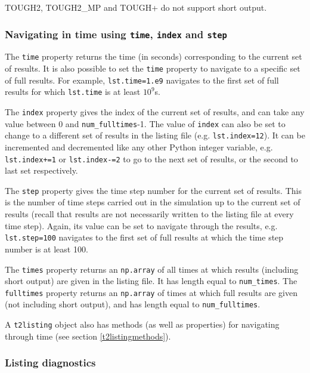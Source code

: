 TOUGH2, TOUGH2\_MP and TOUGH+ do not support short output.

\subsubsection{Navigating in time using \texttt{time}, \texttt{index} and \texttt{step}}

The \texttt{time} property returns the time (in seconds) corresponding to the current set of results.  It is also possible to set the \texttt{time} property to navigate to a specific set of full results.  For example, \texttt{lst.time=1.e9} navigates to the first set of full results for which \texttt{lst.time} is at least $10^9$s.

The \texttt{index} property gives the index of the current set of results, and can take any value between 0 and \texttt{num\_fulltimes}-1.  The value of \texttt{index} can also be set to change to a different set of results in the listing file (e.g. \texttt{lst.index=12}).  It can be incremented and decremented like any other Python integer variable, e.g. \texttt{lst.index+=1} or \texttt{lst.index-=2} to go to the next set of results, or the second to last set respectively.

The \texttt{step} property gives the time step number for the current set of results.  This is the number of time steps carried out in the simulation up to the current set of results (recall that results are not necessarily written to the listing file at every time step).  Again, its value can be set to navigate through the results, e.g. \texttt{lst.step=100} navigates to the first set of full results at which the time step number is at least 100.

The \texttt{times} property returns an \texttt{np.array} of all times at which results (including short output) are given in the listing file.  It has length equal to \texttt{num\_times}.  The \texttt{fulltimes} property returns an \texttt{np.array} of times at which full results are given (not including short output), and has length equal to \texttt{num\_fulltimes}.

A \texttt{t2listing} object also has methods (as well as properties) for navigating through time (see section \ref{t2listingmethods}).

\subsubsection{Listing diagnostics}

